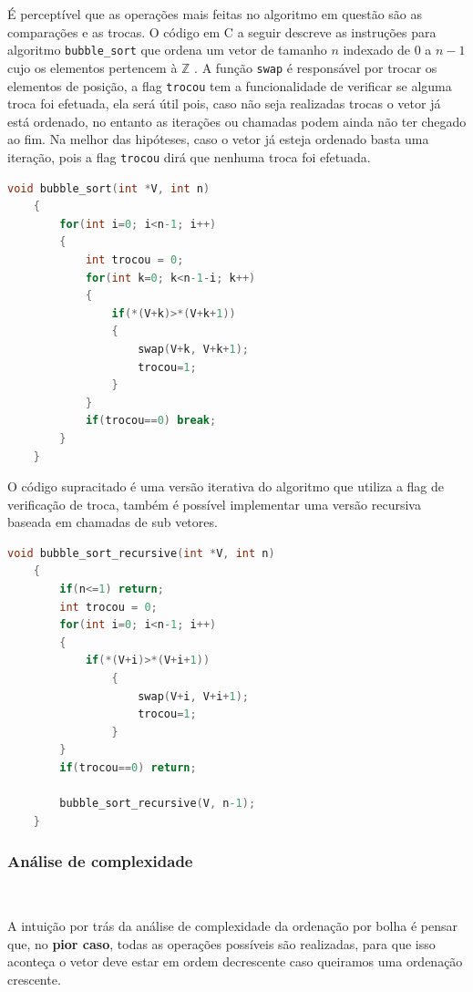 É perceptível que as operações mais feitas no algoritmo em questão são as comparações e as trocas. O código em C a seguir descreve as instruções para algoritmo \texttt{bubble\_sort} que ordena um vetor de tamanho $n$ indexado de $0$ a $n-1$ cujo os elementos pertencem à $\mathbb{Z}$ . A função \texttt{swap} é responsável por trocar os elementos de posição, a flag \texttt{trocou} tem a funcionalidade de verificar se alguma troca foi efetuada, ela será útil pois, caso não seja realizadas trocas o vetor já está ordenado, no entanto as iterações ou chamadas podem ainda não ter chegado ao fim. Na melhor das hipóteses, caso o vetor já esteja ordenado basta uma iteração, pois a flag \texttt{trocou} dirá que nenhuma troca foi efetuada.

\begin{lstlisting}[language=C, frame=single]
    void bubble_sort(int *V, int n)
    {
        for(int i=0; i<n-1; i++)
        {
            int trocou = 0;
            for(int k=0; k<n-1-i; k++)
            {
                if(*(V+k)>*(V+k+1))
                {
                    swap(V+k, V+k+1);
                    trocou=1;
                }
            }
            if(trocou==0) break;
        }
    }
\end{lstlisting}

O código supracitado é uma versão iterativa do algoritmo que utiliza a flag de verificação de troca, também é possível implementar uma versão recursiva baseada em chamadas de sub vetores.

\begin{lstlisting}[language=C, frame=single]
    void bubble_sort_recursive(int *V, int n)
    {
        if(n<=1) return;
        int trocou = 0;
        for(int i=0; i<n-1; i++)
        {
            if(*(V+i)>*(V+i+1))
                {
                    swap(V+i, V+i+1);
                    trocou=1;
                }
        }
        if(trocou==0) return;

        bubble_sort_recursive(V, n-1);
    }
\end{lstlisting}

\subsubsection{Análise de complexidade}
\

A intuição por trás da análise de complexidade da ordenação por bolha é pensar que, no \textbf{pior caso}, todas as operações possíveis são realizadas, para que isso aconteça o vetor deve estar em ordem decrescente caso queiramos uma ordenação crescente.

